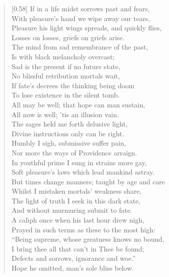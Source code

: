 \begin{verse}[0.58\textwidth]
If in a life midst sorrows past and fears,\\
With pleasure's hand we wipe away our tears,\\
Pleasure his light wings spreads, and quickly flies,\\
Losses on losses, griefs on griefs arise.\\
The mind from sad remembrance of the past,\\
Is with black melancholy overcast;\\
Sad is the present if no future state,\\
No blissful retribution mortals wait,\\
If fate's decrees the thinking being doom\\
To lose existence in the silent tomb.\\
All may be well; that hope can man sustain,\\
All now is well; 'tis an illusion vain.\\
The sages held me forth delusive light,\\
Divine instructions only can be right.\\
Humbly I sigh, submissive suffer pain,\\
Nor more the ways of Providence arraign.\\
In youthful prime I sung in strains more gay,\\
Soft pleasure's laws which lead mankind astray.\\
But times change manners; taught by age and care\\
Whilst I mistaken mortals' weakness share,\\
The light of truth I seek in this dark state,\\
And without murmuring submit to fate.\\
A caliph once when his last hour drew nigh,\\
Prayed in such terms as these to the most high:\\
``Being supreme, whose greatness knows no bound,\\
I bring thee all that can't in Thee be found;\\
Defects and sorrows, ignorance and woe.''\\
Hope he omitted, man's sole bliss below.
\end{verse}

